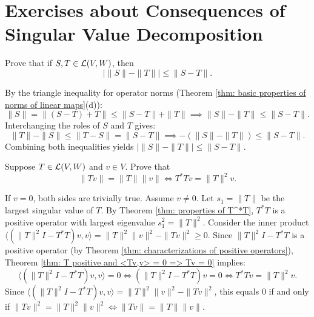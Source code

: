\section*{Exercises about Consequences of Singular Value Decomposition}

\begin{xrcs}
  Prove that if $S, T \in \mathcal{L}(V,W)$, then
  \begin{equation}
    |\|S\| - \|T\|| \leq \|S - T\|.
  \end{equation}

\begin{xprf}
  By the triangle inequality for operator norms (Theorem \ref{thm: basic properties of norms of linear maps}(d)):
  \[
    \|S\| = \|(S - T) + T\| \leq \|S - T\| + \|T\| \implies \|S\| - \|T\| \leq \|S - T\|.
  \]
  Interchanging the roles of $S$ and $T$ gives:
  \[
    \|T\| - \|S\| \leq \|T - S\| = \|S - T\| \implies -(\|S\| - \|T\|) \leq \|S - T\|.
  \]
  Combining both inequalities yields $|\|S\| - \|T\|| \leq \|S - T\|$.
\end{xprf}
\end{xrcs}

\begin{xrcs}
  Suppose $T \in \mathcal{L}(V,W)$ and $v \in V$. Prove that
  \begin{equation}
    \|Tv\| = \|T\| \|v\| \iff T^*Tv = \|T\|^2 v.
  \end{equation}

\begin{xprf}
  If $v = 0$, both sides are trivially true. Assume $v \neq 0$.
  Let $s_1 = \|T\|$ be the largest singular value of $T$.
  By Theorem \ref{thm: properties of T^*T}, $T^*T$ is a positive operator with largest eigenvalue $s_1^2 = \|T\|^2$.
  Consider the inner product $\langle (\|T\|^2 I - T^*T)v, v \rangle = \|T\|^2 \|v\|^2 - \|Tv\|^2 \ge 0$.
  Since $\|T\|^2 I - T^*T$ is a positive operator (by Theorem \ref{thm: characterizations of positive operators}), Theorem \ref{thm: T positive and <Tv,v> = 0 => Tv = 0} implies:
  \[
    \langle (\|T\|^2 I - T^*T)v, v \rangle = 0 \iff (\|T\|^2 I - T^*T)v = 0 \iff T^*Tv = \|T\|^2 v.
  \]
  Since $\langle (\|T\|^2 I - T^*T)v, v \rangle = \|T\|^2 \|v\|^2 - \|Tv\|^2$, this equals $0$ if and only if $\|Tv\|^2 = \|T\|^2 \|v\|^2 \iff \|Tv\| = \|T\| \|v\|$.
\end{xprf}
\end{xrcs}

